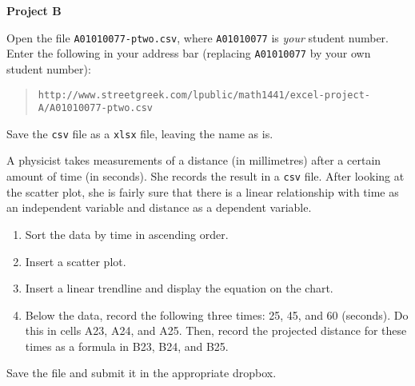 \documentclass[11pt]{article}
\begin{document}
\textbf{Project B}

Open the file \texttt{A01010077-ptwo.csv}, where \texttt{A01010077} is
\emph{your} student number. Enter the following in your address bar
(replacing \texttt{A01010077} by your own student number):

\begin{quote}
  \texttt{http://www.streetgreek.com/lpublic/math1441/excel-project-A/A01010077-ptwo.csv}
\end{quote}

Save the \texttt{csv} file as a \texttt{xlsx} file, leaving the name
as is.

A physicist takes measurements of a distance (in millimetres) after a
certain amount of time (in seconds). She records the result in a
\texttt{csv} file. After looking at the scatter plot, she is fairly
sure that there is a linear relationship with time as an independent
variable and distance as a dependent variable.

\begin{enumerate}
\item Sort the data by time in ascending order.
\item Insert a scatter plot.
\item Insert a linear trendline and display the equation on the chart.
\item Below the data, record the following three times: 25, 45, and 60
  (seconds). Do this in cells A23, A24, and A25. Then, record
  the projected distance for these times as a formula in B23, B24, and
  B25.
\end{enumerate}

Save the file and submit it in the appropriate dropbox.
\end{document}
